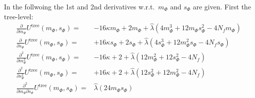In the follwoing the 1st and 2nd derivatives w.r.t.\ $m_{\Phi}$ and $s_{\Phi}$ are given. First the tree-level:
\begin{align}\label{CEP_derivative_dm_treeLevel}
 \frac{\partial}{\partial m_{\Phi}}  U^{\text{tree}}(m_{\Phi}, s_{\Phi})=&
                    -16 \kappa m_{\Phi} + 2 m_{\Phi} + \hat\lambda \left( 4 m_{\Phi}^3 + 12 m_{\Phi} s_{\Phi}^2 -4 N_f  m_{\Phi} \right)
                    \\ \label{eq:CEP_derivative_ds_treeLevel}
 \frac{\partial}{\partial s_{\Phi}}  U^{\text{tree}}(m_{\Phi}, s_{\Phi})=&
                    +16 \kappa s_{\Phi} + 2 s_{\Phi} + \hat\lambda \left( 4 s_{\Phi}^3 + 12 m_{\Phi}^2 s_{\Phi} -4 N_f  s_{\Phi} \right)
                    \\ \label{eq:CEP_derivative_dmdm_treeLevel}
 \frac{\partial^2}{\partial m_{\Phi}^2}  U^{\text{tree}}(m_{\Phi}, s_{\Phi})=&
                    -16 \kappa  + 2 + \hat\lambda \left( 12 m_{\Phi}^2 + 12 s_{\Phi}^2 - 4 N_f \right)
                    \\ \label{eq:CEP_derivative_dsds_treeLevel}
 \frac{\partial^2}{\partial s_{\Phi}^2}  U^{\text{tree}}(m_{\Phi}, s_{\Phi})=&
                    +16 \kappa  + 2 + \hat\lambda \left( 12 s_{\Phi}^2 + 12 m_{\Phi}^2 - 4 N_f \right)
 \\ \label{eq:CEP_derivative_dmds_treeLevel}
 \frac{\partial^2}{\partial m_{\Phi} \partial s_{\Phi}}  U^{\text{tree}}(m_{\Phi}, s_{\Phi})=&
                    \hat\lambda \left( 24 m_{\Phi} s_{\Phi} \right) 
\end{align}

